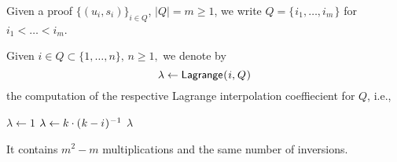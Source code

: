 \documentclass[psamsfonts, reqno]{amsart}
\theoremstyle{definition}
\theoremstyle{remark}
\numberwithin{equation}{section}
\begin{document}
Given a proof $\{(u_i, s_i)\}_{i \in Q}$, $|Q| = m \ge 1$,
we write $Q = \{\hspace{1pt}i_1, \dots, i_m\hspace{1pt}\}$
for $i_1 < \dots < i_m$.

Given $i \in Q \subset \{1, \dots, n\},\hspace{2pt} n \ge 1,$
we denote by
\vspace{5pt}
\begin{equation*}
\lambda \leftarrow \mathsf{Lagrange}\hspace{0.5pt}(
\hspace{0.5pt}
i,
\hspace{0.5pt}
Q
\hspace{0.5pt})
\vspace{5pt}
\end{equation*}
the computation of the respective Lagrange interpolation
coeffiecient for $Q$, i.e.,
\begin{algorithmic}[0]
\vspace{5pt}
	\vspace{2pt}
	\State
		$\lambda \leftarrow 1$
		\vspace{2pt}
	\vspace{2pt}
		\vspace{2pt}
			\State
    			$\lambda \leftarrow k \cdot
    			(\hspace{0.5pt}k - i\hspace{0.5pt}) ^ {\hspace{0.5pt}-1}$
    			\vspace{2pt}
    	\EndFor
	\EndFor
	\Return $\lambda$
\vspace{5pt}
\end{algorithmic}
It contains $m^2-m$ multiplications and the same number of inversions.
\end{document}
